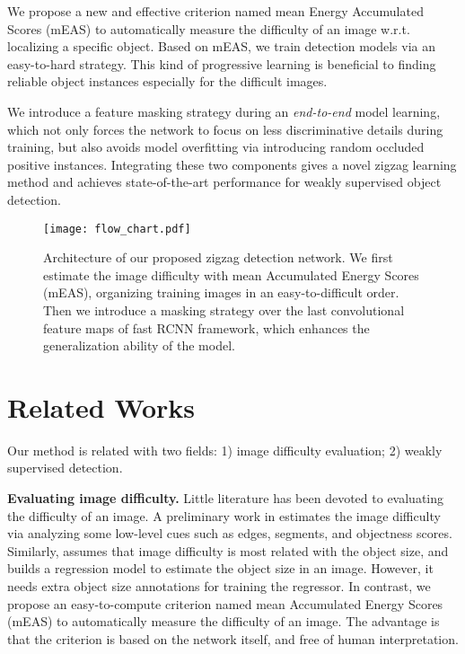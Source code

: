 \documentclass[10pt,twocolumn,letterpaper]{article}
\begin{document}
 We propose a new and effective criterion named mean Energy Accumulated Scores (mEAS) to automatically measure the difficulty of an image w.r.t. localizing a specific object. Based on mEAS, we train detection models via an easy-to-hard strategy. This kind of progressive learning is beneficial to finding reliable object instances especially for the difficult images.

 We introduce a feature masking strategy during an \emph{end-to-end} model learning, which not only forces the network to focus on less discriminative details during training, but also avoids model overfitting via introducing random occluded positive instances. Integrating these two components gives a novel zigzag learning method and achieves state-of-the-art performance for weakly supervised object detection.

\begin{figure*}[t]
  \centering
\texttt{[image: flow\_chart.pdf]} \\
   \vspace{0.1cm}
  \caption{Architecture of our proposed zigzag detection network. We first estimate the image difficulty with mean Accumulated Energy Scores (mEAS), organizing training images in an easy-to-difficult order. Then we introduce a masking strategy over the last convolutional feature maps of fast RCNN framework, which enhances the generalization ability of the model.} \label{flow_chart}
  \vspace{-0.1cm}
\end{figure*}

\section{Related Works}
Our method is related with two fields: 1) image difficulty evaluation; 2) weakly supervised detection. 

\textbf{Evaluating image difficulty.} Little literature has been devoted to evaluating the difficulty of an image. A preliminary work in \cite{tudor2016hard} estimates the image difficulty via analyzing some low-level cues such as edges, segments, and objectness scores. Similarly,  \cite{shi2016weakly} assumes that image difficulty is most related with the object size, and builds a regression model to estimate the object size in an image. However, it needs extra object size annotations for training the regressor. In contrast, we propose an easy-to-compute criterion named mean Accumulated Energy Scores (mEAS) to automatically measure the difficulty of an image. The advantage is that the criterion is based on the network itself, and free of human interpretation. 
\end{document}
